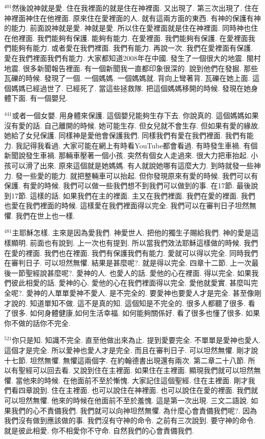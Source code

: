 \documentclass{book}
\begin{document}
$^{401}$然後說神就是愛.
住在我裡面的就是住在神裡面.
又出現了.
第三次出現了.
住在神裡面神住在他裡面.
原來住在愛裡面的人.
就有這兩方面的東西.
有神的保護有神的能力.
前面說神就是愛.
神就是愛.
所以住在愛裡面就是住在神裡面.
同時神也住在他裡面.
我們能夠有保護.
能夠有能力.
在愛裡面.
我們能夠有保護.
在愛裡面我們能夠有能力.
或者愛在我們裡面.
我們有能力.
再說一次.
我們在愛裡面有保護.
愛在我們裡面我們有能力.
大家都知道2008年在中國.
發生了一個很大的地震.
閩村地震.
很多新聞報告裡面.
有一個新聞我一直都印象很深的.
說到他們在發掘.
那些瓦礫的時候.
發現了一個.
一個媽媽.
一個媽媽就.
背向上彎著背.
瓦礫在她上面.
這個媽媽已經過世了.
已經死了.
當這些拯救隊.
把這個媽媽移開的時候.
發現在她身體下面.
有一個嬰兒.

$^{441}$或者一個女嬰.
用身體來保護.
這個嬰兒能夠生存下去.
你說真的.
這個媽媽如果沒有愛的話.
自己離開的時候.
她可能生存.
但女兒就不會生存.
但如果有愛的緣故.
她給了女兒保護.
同樣神是愛他會保護我們.
同樣我們有愛在我們裡面.
我們有能力.
我記得我看過.
大家可能在網上有時看YouTube都會看過.
有時發生車禍.
有個新聞說發生車禍.
那輛車壓著一個小孩.
突然有個女人走過來.
很大力把車抬起.
小孩可以滑了出來.
原來這個就是她媽媽.
有人就說她哪有這麼大力.
到時就發一些神力.
發一些愛的能力.
就把整輛車可以抬起.
但你發現原來有愛的時候.
我們可以有保護.
有愛的時候.
我們可以做一些我們想不到我們可以做到的事.
在17節.
最後說到17節.
這樣的話.
如果我們在主的裡面.
主又在我們裡面.
我們在愛的裡面.
我們也愛在我們裡面的時候.
這樣愛在我們裡面得以完全.
我們可以在審判日子坦然無懼.
我們在世上也一樣.

$^{481}$主耶穌怎樣.
主來是因為愛我們.
神愛世人.
把他的獨生子賜給我們.
神的愛是這樣顯明.
前面也有說到.
上一次也有提到.
所以當我們效法耶穌這樣做的時候.
我們在愛的裡面.
我們也在裡面.
我們有保護我們有能力.
愛就可以得以完全.
同時我們在審判日子.
可以坦然無懼.
結果是甚麼呢?.
就是得以完全.
四章十二節.
上一次最後一節聖經說甚麼呢?.
愛神的人.
也愛人的話.
愛他的心在裡面.
得以完全.
如果我們彼此相愛的話.
愛神的心.
愛他的心在我們裡面得以完全.
愛他就愛實.
甚麼叫完全呢?.
愛神的人單單愛神不愛人.
是不完全的.
要愛神也要愛人才是完全.
甚至像剛才說的.
知道單知不做.
這不是真的知.
這個知是不完全的.
很多人都聽了很多.
看了很多.
如何身體健康,如何生活幸福.
如何能夠關係好.
看了很多也懂了很多.
如果你不做的話你不完全.

$^{521}$你只是知.
知識不完全.
直至他做出來為止.
提到愛要完全.
不單單是愛神也愛人.
這個才是完全.
所以愛神也愛人才是完全.
而且在審判日子.
可以坦然無懼.
剛才說十七節.
坦然無懼.
無懼這兩個字.
在約翰德書出現還有兩次.
第二章二十八節.
所以有聖經可以回去看.
又說到住在主裡面.
如果住在主裡面.
顯現我們就可以坦然無懼.
當他來的時候.
在他面前不至於慚愧.
大家記住這個聖經.
住在主裡面.
剛才我們看四章說到.
住在主裡面.
也可以說住在神裡面.
也可以說住在愛的裡面.
我們就可以坦然無懼.
他來的時候在他面前不至於羞愧.
這是第一次出現.
三文二語說.
如果我們的心不責備我們.
我們就可以向神坦然無懼.
為什麼心會責備我們呢?.
因為我們沒有做到應該做的事.
我們沒有守神的命令.
之前有三次說到.
要守神的命令.
就是彼此相愛.
你不相愛你不守命.
自然我們的心會責備我們.
\end{document}
